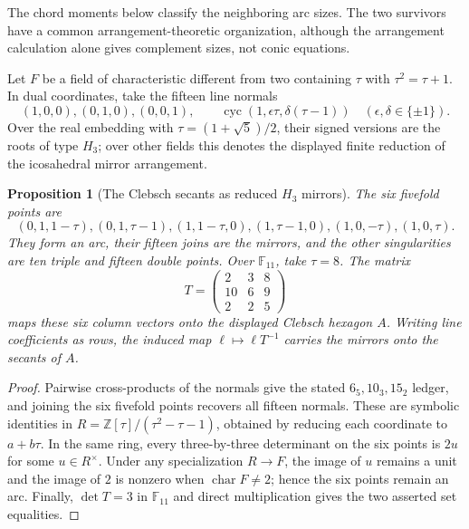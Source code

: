 \documentclass[11pt]{article}
\newtheorem{proposition}[theorem]{Proposition}
\theoremstyle{definition}
\theoremstyle{remark}
\newcommand{\F}{\mathbb{F}}
\begin{document}
The chord moments below classify the neighboring arc sizes. The two
survivors have a common arrangement-theoretic organization, although the
arrangement calculation alone gives complement sizes, not conic equations.

Let $F$ be a field of characteristic different from two containing
$\tau$ with $\tau^2=\tau+1$. In dual coordinates, take the fifteen line
normals
\[
 (1,0,0),(0,1,0),(0,0,1),\qquad
 \operatorname{cyc}(1,\epsilon\tau,\delta(\tau-1))
 \quad(\epsilon,\delta\in\{\pm1\}).
\]
Over the real embedding with $\tau=(1+\sqrt5)/2$, their signed versions
are the roots of type $H_3$; over other fields this denotes the displayed
finite reduction of the icosahedral mirror arrangement.

\begin{proposition}[The Clebsch secants as reduced $H_3$ mirrors]
\label{prop:h3-arrangement}
The six fivefold points are
\[
 (0,1,1-\tau),(0,1,\tau-1),(1,1-\tau,0),(1,\tau-1,0),
 (1,0,-\tau),(1,0,\tau).
\]
They form an arc, their fifteen joins are the mirrors, and the other
singularities are ten triple and fifteen double points. Over $\F_{11}$,
take $\tau=8$. The matrix
\[
 T=\begin{pmatrix}2&3&8\\10&6&9\\2&2&5\end{pmatrix}
\]
maps these six column vectors onto the displayed Clebsch hexagon $A$.
Writing line coefficients as rows, the induced map
$\ell\mapsto\ell T^{-1}$ carries the mirrors onto the secants of $A$.
\end{proposition}

\begin{proof}
Pairwise cross-products of the normals give the stated
$6_5,10_3,15_2$ ledger, and joining the six fivefold points recovers all
fifteen normals. These are symbolic identities in
$R=\mathbb Z[\tau]/(\tau^2-\tau-1)$, obtained by reducing each coordinate
to $a+b\tau$. In the same ring, every three-by-three determinant on the six
points is $2u$ for some $u\in R^\times$. Under any specialization
$R\to F$, the image of $u$ remains a unit and the image of $2$ is nonzero
when $\operatorname{char}F\ne2$; hence the six points remain an arc.
Finally, $\det T=3$ in $\F_{11}$ and direct multiplication gives the two
asserted set equalities.
\end{proof}
\end{document}
